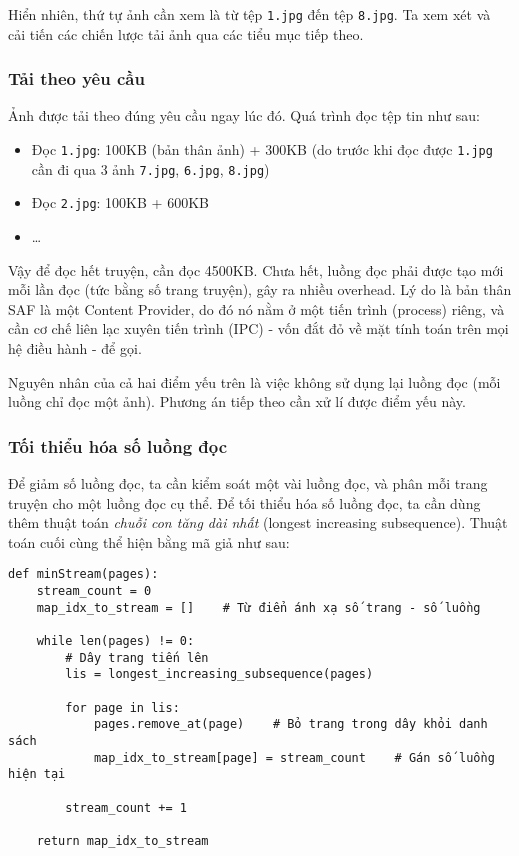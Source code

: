 \documentclass[../../../../thesis]{subfiles}
\begin{document}
Hiển nhiên, thứ tự ảnh cần xem là từ tệp \texttt{1.jpg} đến tệp
\texttt{8.jpg}. Ta xem xét và cải tiến các chiến lược tải ảnh qua các
tiểu mục tiếp theo.

\subsubsection{Tải theo yêu cầu}

Ảnh được tải theo đúng yêu cầu ngay lúc đó. Quá trình đọc tệp tin như sau:

\begin{itemize}
    \item
        Đọc \texttt{1.jpg}: 100KB (bản thân ảnh) + 300KB (do trước khi đọc được
        \texttt{1.jpg} cần đi qua 3 ảnh \texttt{7.jpg}, \texttt{6.jpg},
        \texttt{8.jpg})
    \item
        Đọc \texttt{2.jpg}: 100KB + 600KB
    \item
        \ldots{}
\end{itemize}

Vậy để đọc hết truyện, cần đọc 4500KB. Chưa hết, luồng đọc phải được tạo mới mỗi
lần đọc (tức bằng số trang truyện), gây ra nhiều overhead. Lý do là bản thân SAF
là một Content Provider, do đó nó nằm ở một tiến trình (process) riêng, và cần
cơ chế liên lạc xuyên tiến trình (IPC) - vốn đắt đỏ về mặt tính toán trên mọi hệ
điều hành - để gọi.

Nguyên nhân của cả hai điểm yếu trên là việc không sử dụng lại luồng đọc (mỗi
luồng chỉ đọc một ảnh). Phương án tiếp theo cần xử lí được điểm yếu này.

\subsubsection{Tối thiểu hóa số luồng đọc}

Để giảm số luồng đọc, ta cần kiểm soát một vài luồng đọc, và phân mỗi trang
truyện cho một luồng đọc cụ thể. Để tối thiểu hóa số luồng đọc, ta cần dùng thêm
thuật toán \emph{chuỗi con tăng dài nhất} (longest increasing subsequence).
Thuật toán cuối cùng thể hiện bằng mã giả như sau:

\begin{verbatim}
def minStream(pages):
    stream_count = 0
    map_idx_to_stream = []    # Từ điển ánh xạ số trang - số luồng

    while len(pages) != 0:
        # Dây trang tiến lên
        lis = longest_increasing_subsequence(pages)

        for page in lis:
            pages.remove_at(page)    # Bỏ trang trong dây khỏi danh sách
            map_idx_to_stream[page] = stream_count    # Gán số luồng hiện tại

        stream_count += 1

    return map_idx_to_stream
\end{verbatim}
\end{document}
